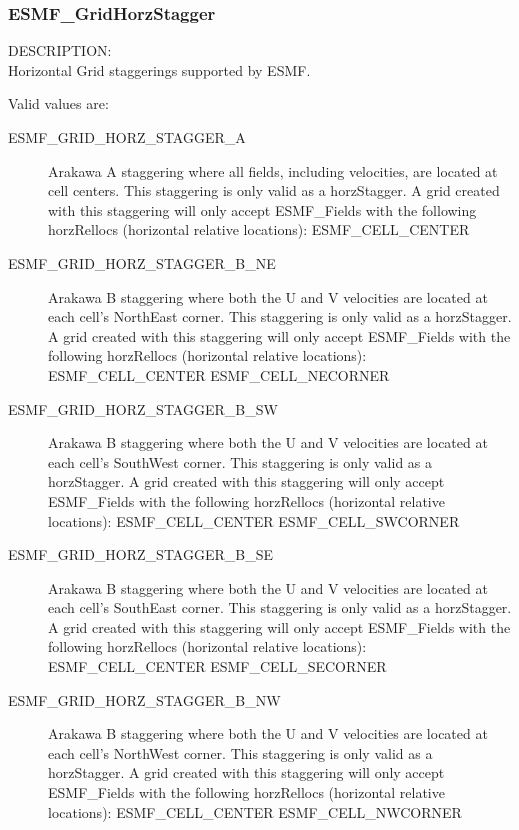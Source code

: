 \subsubsection{ESMF\_GridHorzStagger}

{\sf DESCRIPTION:\\}
Horizontal Grid staggerings supported by ESMF.

Valid values are:
\begin{description}
   \item [ESMF\_GRID\_HORZ\_STAGGER\_A]
         Arakawa A staggering where all fields, including velocities, are
         located at cell centers.  This staggering is only valid as a horzStagger.
         A grid created with this staggering will only accept ESMF\_Fields with
         the following horzRellocs (horizontal relative locations):
             ESMF\_CELL\_CENTER

   \item [ESMF\_GRID\_HORZ\_STAGGER\_B\_NE]
         Arakawa B staggering where both the U and V velocities are located at
         each cell's NorthEast corner.  This staggering is only valid as a
         horzStagger.  A grid created with this staggering will only accept
         ESMF\_Fields with the following horzRellocs (horizontal relative locations):
             ESMF\_CELL\_CENTER
             ESMF\_CELL\_NECORNER

   \item [ESMF\_GRID\_HORZ\_STAGGER\_B\_SW]
         Arakawa B staggering where both the U and V velocities are located at
         each cell's SouthWest corner.  This staggering is only valid as a 
         horzStagger.  A grid created with this staggering will only accept
         ESMF\_Fields with the following horzRellocs (horizontal relative locations):
             ESMF\_CELL\_CENTER
             ESMF\_CELL\_SWCORNER

   \item [ESMF\_GRID\_HORZ\_STAGGER\_B\_SE]
         Arakawa B staggering where both the U and V velocities are located at
         each cell's SouthEast corner.  This staggering is only valid as a 
         horzStagger.  A grid created with this staggering will only accept
         ESMF\_Fields with the following horzRellocs (horizontal relative locations):
             ESMF\_CELL\_CENTER
             ESMF\_CELL\_SECORNER

   \item [ESMF\_GRID\_HORZ\_STAGGER\_B\_NW]
         Arakawa B staggering where both the U and V velocities are located at
         each cell's NorthWest corner.  This staggering is only valid as a 
         horzStagger.  A grid created with this staggering will only accept
         ESMF\_Fields with the following horzRellocs (horizontal relative locations):
             ESMF\_CELL\_CENTER
             ESMF\_CELL\_NWCORNER


\end{description}
